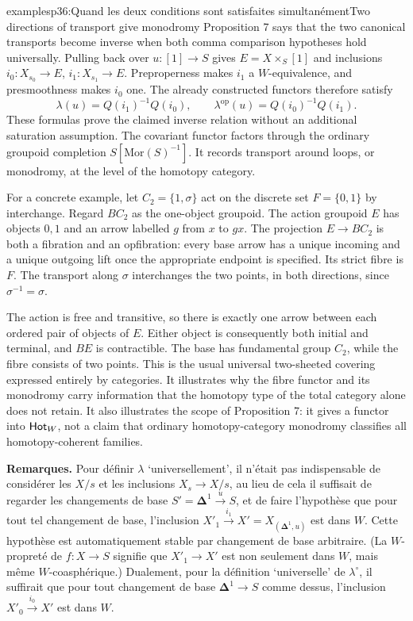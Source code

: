 \begin{dcomment}{examples}{p36:Quand les deux conditions sont satisfaites simultanément}{Two directions of transport give monodromy}
Proposition 7 says that the two canonical transports become inverse when both comma comparison hypotheses hold universally. Pulling back over $u:[1]\to S$ gives $E=X\times_S[1]$ and inclusions $i_0:X_{s_0}\to E$, $i_1:X_{s_1}\to E$. Preproperness makes $i_1$ a $W$-equivalence, and presmoothness makes $i_0$ one. The already constructed functors therefore satisfy
\[
 \lambda(u)=Q(i_1)^{-1}Q(i_0),\qquad
 \lambda^{\mathrm{op}}(u)=Q(i_0)^{-1}Q(i_1).
\]
These formulas prove the claimed inverse relation without an additional saturation assumption. The covariant functor factors through the ordinary groupoid completion $S[\mathrm{Mor}(S)^{-1}]$. It records transport around loops, or monodromy, at the level of the homotopy category.

For a concrete example, let $C_2=\{1,\sigma\}$ act on the discrete set $F=\{0,1\}$ by interchange. Regard $BC_2$ as the one-object groupoid. The action groupoid $E$ has objects $0,1$ and an arrow labelled $g$ from $x$ to $gx$. The projection $E\to BC_2$ is both a fibration and an opfibration: every base arrow has a unique incoming and a unique outgoing lift once the appropriate endpoint is specified. Its strict fibre is $F$. The transport along $\sigma$ interchanges the two points, in both directions, since $\sigma^{-1}=\sigma$.

The action is free and transitive, so there is exactly one arrow between each ordered pair of objects of $E$. Either object is consequently both initial and terminal, and $BE$ is contractible. The base has fundamental group $C_2$, while the fibre consists of two points. This is the usual universal two-sheeted covering expressed entirely by categories. It illustrates why the fibre functor and its monodromy carry information that the homotopy type of the total category alone does not retain. It also illustrates the scope of Proposition 7: it gives a functor into $\mathsf{Hot}_W$, not a claim that ordinary homotopy-category monodromy classifies all homotopy-coherent families.
\end{dcomment}


\textbf{Remarques.} Pour définir $\lambda$ `universellement', il n'était pas indispensable de considérer les $X/s$ et les inclusions $X_s\longrightarrow X/s$, au lieu de cela il suffisait de regarder les changements de base $S'=\mathbf{\Delta}^1\xrightarrow{u}S$, et de faire l'hypothèse que pour tout tel changement de base, l'inclusion $X'_1\xrightarrow{i_1}X'=X_{(\mathbf{\Delta}^1,u)}$ est dans $W$. Cette hypothèse est automatiquement stable par changement de base arbitraire. (La $W$-propreté de $f : X\longrightarrow S$ signifie que $X'_1\longrightarrow X'$ est non seulement dans $W$, mais même $W$-coasphérique.) Dualement, pour la définition `universelle' de $\lambda^\circ$, il suffirait que pour tout changement de base $\mathbf{\Delta}^1\longrightarrow S$ comme dessus, l'inclusion $X'_0\xrightarrow{i_0}X'$ est dans $W$.

